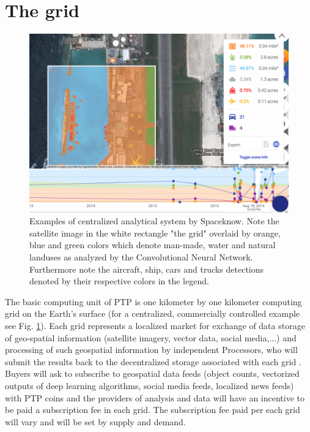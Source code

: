 \documentclass[aps,prl,preprint,groupedaddress]{revtex4}
\begin{document}
\section{The grid}
\begin{figure}[!h]
\includegraphics[width=0.8\linewidth]{computing_grid.png}%
\caption{\label{sk_grid} \small{Examples of centralized analytical system by Spaceknow. Note the satellite image in the white rectangle "the grid" overlaid by orange, blue and green colors which denote man-made, water and natural landuses as analyzed by the Convolutional Neural Network. Furthermore note the aircraft, ship, cars and trucks detections denoted by their respective colors in the legend. }}
\end{figure}

The basic computing unit of PTP is one kilometer by one kilometer computing grid on the Earth's surface (for a centralized, commercially controlled example see Fig. \ref{sk_grid}). Each grid represents a localized market for exchange of data storage of geo-spatial information (satellite imagery, vector data, social media,...) and processing of such geospatial information by independent Processors, who will submit the results back to the decentralized storage associated with each grid \cite{benet2014ipfs}.
Buyers will ask to subscribe to geospatial data feeds (object counts, vectorized outputs of deep learning algorithms, social media feeds, localized news feeds) with PTP coins and the providers of analysis and data will have an incentive to be paid a subscription fee in each grid. The subscription fee paid per each grid will vary and will be set by supply and demand. 
\end{document}
